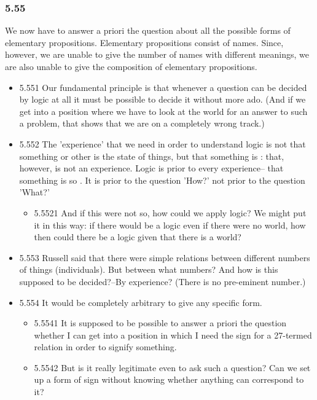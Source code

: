 \documentclass[11pt]{article}
\begin{document}
\subsubsection*{5.55}
\label{sec:orgefcd510}
We now have to answer a priori the question about all the possible
forms of elementary propositions. Elementary propositions consist of names.
Since, however, we are unable to give the number of names with different
meanings, we are also unable to give the composition of elementary
propositions.
\begin{itemize}
\item 5.551
\label{sec:org8b5efac}
Our fundamental principle is that whenever a question can be decided
by logic at all it must be possible to decide it without more ado. (And if
we get into a position where we have to look at the world for an answer to
such a problem, that shows that we are on a completely wrong track.)
\item 5.552
\label{sec:org2968d52}
The 'experience' that we need in order to understand logic is not
that something or other is the state of things, but that something is :
that, however, is not an experience. Logic is prior to every experience--
that something is so . It is prior to the question 'How?' not prior to the
question 'What?'
\begin{itemize}
\item 5.5521
\label{sec:org7950393}
And if this were not so, how could we apply logic? We might put it
in this way: if there would be a logic even if there were no world, how
then could there be a logic given that there is a world?
\end{itemize}
\item 5.553
\label{sec:org2fc4a9e}
Russell said that there were simple relations between different
numbers of things (individuals). But between what numbers? And how is this
supposed to be decided?--By experience? (There is no pre-eminent number.)
\item 5.554
\label{sec:org55f7487}
It would be completely arbitrary to give any specific form.
\begin{itemize}
\item 5.5541
\label{sec:org599bf37}
It is supposed to be possible to answer a priori the question
whether I can get into a position in which I need the sign for a 27-termed
relation in order to signify something.
\item 5.5542
\label{sec:orga4c5235}
But is it really legitimate even to ask such a question? Can we set
up a form of sign without knowing whether anything can correspond to it?

\end{itemize}
\end{itemize}
\end{document}
